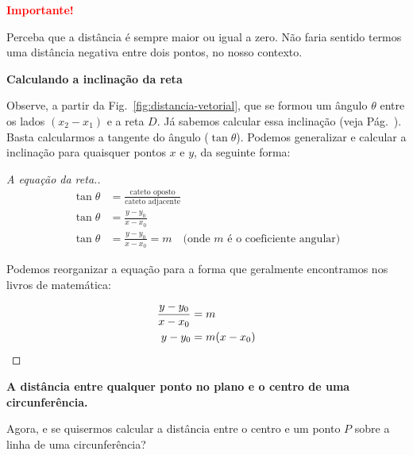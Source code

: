 \documentclass[12pt,openright,twoside,a4paper]{article}
\theoremstyle{definition}
\begin{document}
	\begin{snugshade}
		\textbf{\textcolor{red}{Importante!}}
	
		Perceba que a distância é sempre maior ou igual a zero. Não faria sentido termos uma distância negativa entre dois pontos, no nosso contexto.
	\end{snugshade}
	
	\textbf{Calculando a inclinação da reta}
	
	Observe, a partir da Fig.~\ref{fig:distancia-vetorial}, que se formou um ângulo $\theta$ entre os lados $(x_2 - x_1)$ e a reta $D$. Já sabemos calcular essa inclinação (veja Pág.~\pageref{tema:coef_angular}). Basta calcularmos a tangente do ângulo ($\tan{\theta}$). Podemos generalizar e calcular a inclinação para quaisquer pontos $x$ e $y$, da seguinte forma:
	
	\begin{proof}[A equação da reta.]
		\begin{align*}
			\tan{\theta} &= \frac{\text{cateto oposto}}{\text{cateto adjacente}}\\
			\tan{\theta} &= \frac{y - y_0}{x - x_0}\\
			\tan{\theta} &= \frac{y - y_0}{x - x_0}=m \quad \text{(onde $m$ é o coeficiente angular)}
		\end{align*}
		
		Podemos reorganizar a equação para a forma que geralmente encontramos nos livros de matemática:
		
		\begin{align*}
			\frac{y - y_0}{x - x_0} &= m\\
			y - y_0 &= m(x - x_0) \qedhere
		\end{align*}
	\end{proof}
	
	\textbf{A distância entre qualquer ponto no plano e o centro de uma circunferência.}
	
	Agora, e se quisermos calcular a distância entre o centro e um ponto $P$ sobre a linha de uma circunferência?
	
\end{document}

